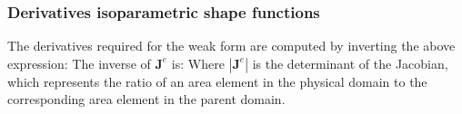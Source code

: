 \documentclass[notes]{beamer}
\begin{document}
\begin{frame}
\frametitle{Derivatives isoparametric shape functions}
The derivatives required for the weak form are computed by
inverting the above expression:
The inverse of $\mathbf{J}^e$ is:
Where $\left|\mathbf{J}^e\right|$ is the determinant of the Jacobian, which represents the ratio of an area element in the physical domain to the corresponding area element in the parent domain.
\end{frame}
\end{document}

